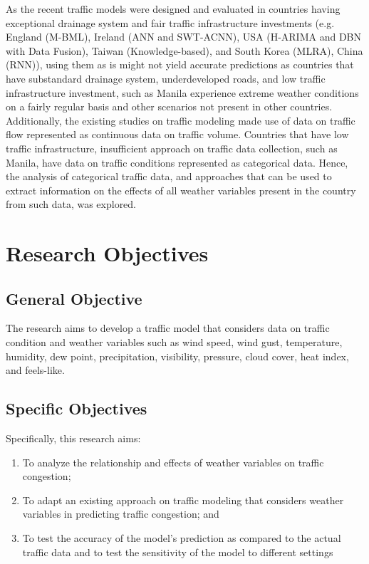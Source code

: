 As the recent traffic models were designed and evaluated in countries having exceptional drainage system and fair traffic infrastructure investments (e.g. England (M-BML), Ireland (ANN and SWT-ACNN), USA (H-ARIMA and DBN with Data Fusion), Taiwan (Knowledge-based), and South Korea (MLRA), China (RNN)), using them as is might not yield accurate predictions as countries that have substandard drainage system, underdeveloped roads, and low traffic infrastructure investment, such as Manila experience extreme weather conditions on a fairly regular basis and other scenarios not present in other countries. Additionally, the existing studies on traffic modeling made use of data on traffic flow represented as continuous data on traffic volume. Countries that have low traffic infrastructure, insufficient approach on traffic data collection, such as Manila, have data on traffic conditions represented as categorical data. Hence, the analysis of categorical traffic data, and approaches that can be used to extract information on the effects of all weather variables present in the country from such data, was explored.



\section{Research Objectives}
\label{sec:researchobjectives}

\subsection{General Objective}
\label{sec:generalobjective}

The research aims to develop a traffic model that considers data on traffic condition and weather variables such as wind speed, wind gust, temperature, humidity, dew point, precipitation, visibility, pressure, cloud cover, heat index, and feels-like.


\subsection{Specific Objectives}
\label{sec:specificobjectives}
Specifically, this research aims:
\begin{enumerate}
    \item To analyze the relationship and effects of weather variables on traffic congestion;
    \item To adapt an existing approach on traffic modeling that considers weather variables in predicting traffic congestion; and
    \item  To test the accuracy of the model’s prediction as compared to the actual traffic data and to test the sensitivity of the model to different settings
\end{enumerate}


